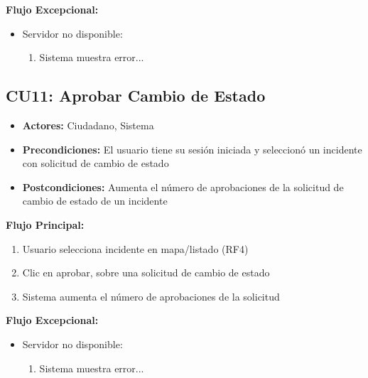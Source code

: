 \begin{multicols}{2}
\textbf{Flujo Excepcional:}
\begin{itemize}
    \item Servidor no disponible:
    \begin{enumerate}
        \item Sistema muestra error...
    \end{enumerate}
\end{itemize}

\subsection*{CU11: Aprobar Cambio de Estado}
\begin{itemize}
    \item \textbf{Actores:} Ciudadano, Sistema
    \item \textbf{Precondiciones:} El usuario tiene su sesión iniciada y seleccionó un incidente con solicitud de cambio de estado
    \item \textbf{Postcondiciones:} Aumenta el número de aprobaciones de la solicitud de cambio de estado de un incidente
\end{itemize}
\textbf{Flujo Principal:}
\begin{enumerate}
    \item Usuario selecciona incidente en mapa/listado (RF4)
    \item Clic en aprobar, sobre una solicitud de cambio de estado
    \item Sistema aumenta el número de aprobaciones de la solicitud
\end{enumerate}

\textbf{Flujo Excepcional:}
\begin{itemize}
    \item Servidor no disponible:
    \begin{enumerate}
        \item Sistema muestra error...
    \end{enumerate}
\end{itemize}


\end{multicols}
